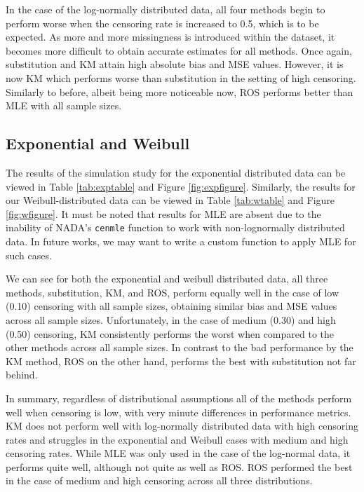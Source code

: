 \documentclass[12pt, twoside]{amherstthesis}
\begin{document}
In the case of the log-normally distributed data, all four methods begin to perform worse when the censoring rate is increased to 0.5, which is to be expected. As more and more missingness is introduced within the dataset, it becomes more difficult to obtain accurate estimates for all methods. Once again, substitution and KM attain high absolute bias and MSE values. However, it is now KM which performs worse than substitution in the setting of high censoring. Similarly to before, albeit being more noticeable now, ROS performs better than MLE with all sample sizes.

\hypertarget{exponentialweibullsimstudy}{%
\subsection{Exponential and Weibull}\label{exponentialweibullsimstudy}}

The results of the simulation study for the exponential distributed data can be viewed in Table \ref{tab:exptable} and Figure \ref{fig:expfigure}. Similarly, the results for our Weibull-distributed data can be viewed in Table \ref{tab:wtable} and Figure \ref{fig:wfigure}. It must be noted that results for MLE are absent due to the inability of NADA's \texttt{cenmle} function to work with non-lognormally distributed data. In future works, we may want to write a custom function to apply MLE for such cases.

We can see for both the exponential and weibull distributed data, all three methods, substitution, KM, and ROS, perform equally well in the case of low (0.10) censoring with all sample sizes, obtaining similar bias and MSE values across all sample sizes. Unfortunately, in the case of medium (0.30) and high (0.50) censoring, KM consistently performs the worst when compared to the other methods across all sample sizes. In contrast to the bad performance by the KM method, ROS on the other hand, performs the best with substitution not far behind.

In summary, regardless of distributional assumptions all of the methods perform well when censoring is low, with very minute differences in performance metrics. KM does not perform well with log-normally distributed data with high censoring rates and struggles in the exponential and Weibull cases with medium and high censoring rates. While MLE was only used in the case of the log-normal data, it performs quite well, although not quite as well as ROS. ROS performed the best in the case of medium and high censoring across all three distributions.
\end{document}
